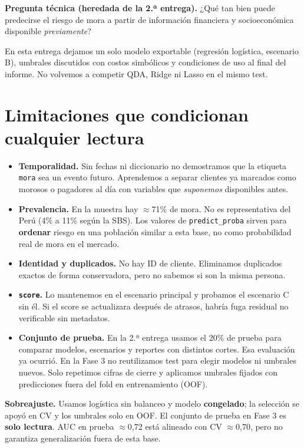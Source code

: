 \documentclass[11pt]{article}
\begin{document}
\textbf{Pregunta técnica (heredada de la 2.ª entrega).} ¿Qué tan bien puede predecirse el riesgo de mora a partir de información financiera y socioeconómica disponible \emph{previamente}?

En esta entrega dejamos un solo modelo exportable (regresión logística, escenario B), umbrales discutidos con costos simbólicos y condiciones de uso al final del informe. No volvemos a competir QDA, Ridge ni Lasso en el mismo test.

\section{Limitaciones que condicionan cualquier lectura}

\begin{itemize}
\item \textbf{Temporalidad.} Sin fechas ni diccionario no demostramos que la etiqueta \texttt{mora} sea un evento futuro. Aprendemos a separar clientes ya marcados como morosos o pagadores al día con variables que \emph{suponemos} disponibles antes.
\item \textbf{Prevalencia.} En la muestra hay $\approx$71\% de mora. No es representativa del Perú (4\% a 11\% según la SBS). Los valores de \texttt{predict\_proba} sirven para \textbf{ordenar} riesgo en una población similar a esta base, no como probabilidad real de mora en el mercado.
\item \textbf{Identidad y duplicados.} No hay ID de cliente. Eliminamos duplicados exactos de forma conservadora, pero no sabemos si son la misma persona.
\item \textbf{\texttt{score}.} Lo mantenemos en el escenario principal y probamos el escenario C sin él. Si el score se actualizara después de atrasos, habría fuga residual no verificable sin metadatos.
\item \textbf{Conjunto de prueba.} En la 2.ª entrega usamos el 20\% de prueba para comparar modelos, escenarios y reportes con distintos cortes. Esa evaluación ya ocurrió. En la Fase 3 no reutilizamos test para elegir modelos ni umbrales nuevos. Solo repetimos cifras de cierre y aplicamos umbrales fijados con predicciones fuera del fold en entrenamiento (OOF).
\end{itemize}

\noindent\textbf{Sobreajuste.} Usamos logística sin balanceo y modelo \textbf{congelado}; la selección se apoyó en CV y los umbrales solo en OOF. El conjunto de prueba en Fase 3 es \textbf{solo lectura}. AUC en prueba $\approx$0,72 está alineado con CV $\approx$0,70, pero no garantiza generalización fuera de esta base.
\end{document}
